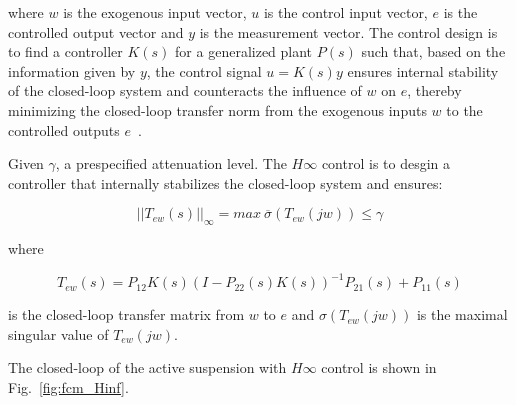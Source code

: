 where $w$ is the exogenous input vector, $u$ is the control input vector, $e$ is the controlled output vector and $y$ is the measurement vector.
%
The control design is to find a controller $K(s)$ for a generalized plant $P(s)$ such that, based on the information given by $y$, the control signal $u=K(s)y$ ensures internal stability of the closed-loop system and counteracts the influence of $w$ on $e$, thereby minimizing the closed-loop transfer norm from the exogenous inputs $w$ to the controlled outputs $e$~\cite{doi:10.1076/vesd.39.4.279.14149}.

Given $\gamma$, a prespecified attenuation level.
%
The $H\infty$ control is to desgin a controller that internally stabilizes the closed-loop system and ensures:

\begin{equation}
 ||T_{ew}(s)||_{\infty} = max~\overline{\sigma}(T_{ew}(jw)) \leq \gamma
\end{equation}

where

\begin{equation}
T_{ew}(s)=P_{12}K(s)(I-P_{22}(s)K(s))^{-1}P_{21}(s)+P_{11}(s)
\end{equation}

is the closed-loop transfer matrix from $w$ to $e$ and $\sigma(T_{ew}(jw))$ is the maximal singular value of $T_{ew}(jw)$.

The closed-loop of the active suspension with $H\infty$ control is shown in Fig.~\ref{fig:fcm_Hinf}.

